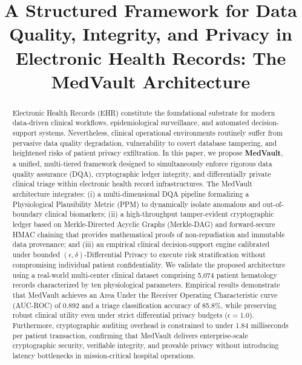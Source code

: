 \documentclass[conference]{IEEEtran}
\begin{document}
\title{A Structured Framework for Data Quality, Integrity, and Privacy in Electronic Health Records: The MedVault Architecture}

\author{
}

\maketitle

\begin{abstract}
Electronic Health Records (EHR) constitute the foundational substrate for modern data-driven clinical workflows, epidemiological surveillance, and automated decision-support systems. Nevertheless, clinical operational environments routinely suffer from pervasive data quality degradation, vulnerability to covert database tampering, and heightened risks of patient privacy exfiltration. In this paper, we propose \textbf{MedVault}, a unified, multi-tiered framework designed to simultaneously enforce rigorous data quality assurance (DQA), cryptographic ledger integrity, and differentially private clinical triage within electronic health record infrastructures. The MedVault architecture integrates: (i) a multi-dimensional DQA pipeline formalizing a Physiological Plausibility Metric (PPM) to dynamically isolate anomalous and out-of-boundary clinical biomarkers; (ii) a high-throughput tamper-evident cryptographic ledger based on Merkle-Directed Acyclic Graphs (Merkle-DAG) and forward-secure HMAC chaining that provides mathematical proofs of non-repudiation and immutable data provenance; and (iii) an empirical clinical decision-support engine calibrated under bounded $(\epsilon, \delta)$-Differential Privacy to execute risk stratification without compromising individual patient confidentiality. We validate the proposed architecture using a real-world multi-center clinical dataset comprising 5,074 patient hematology records characterized by ten physiological parameters. Empirical results demonstrate that MedVault achieves an Area Under the Receiver Operating Characteristic curve (AUC-ROC) of 0.892 and a triage classification accuracy of 85.8\%, while preserving robust clinical utility even under strict differential privacy budgets ($\epsilon = 1.0$). Furthermore, cryptographic auditing overhead is constrained to under 1.84 milliseconds per patient transaction, confirming that MedVault delivers enterprise-scale cryptographic security, verifiable integrity, and provable privacy without introducing latency bottlenecks in mission-critical hospital operations.
\end{abstract}
\end{document}
